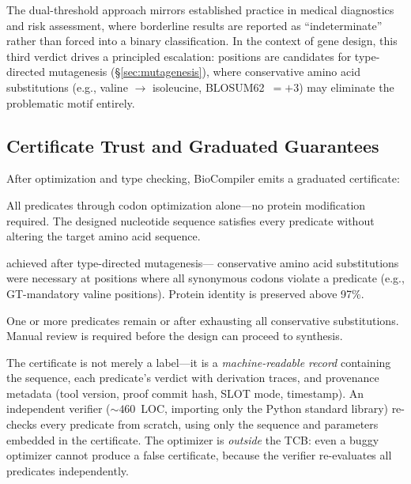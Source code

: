The dual-threshold approach mirrors established practice in medical
diagnostics and risk assessment, where borderline results are reported
as ``indeterminate'' rather than forced into a binary classification.
In the context of gene design, this third verdict drives a principled
escalation: \UNCERTAIN{} positions are candidates for type-directed
mutagenesis (\S\ref{sec:mutagenesis}), where conservative amino acid
substitutions (e.g., valine $\to$ isoleucine, BLOSUM62~$= +3$) may
eliminate the problematic motif entirely.

\subsection{Certificate Trust and Graduated Guarantees}

After optimization and type checking, BioCompiler emits a graduated
certificate:
\begin{description}[leftmargin=!,labelwidth=1.4cm,itemsep=1pt,
                     topsep=1pt]
\item[\GOLD] All predicates \PASS{} through codon optimization
      alone---no protein modification required.
      The designed nucleotide sequence satisfies every predicate
      without altering the target amino acid sequence.
\item[\SILVER] \PASS{} achieved after type-directed mutagenesis---
      conservative amino acid substitutions were necessary at positions
      where all synonymous codons violate a predicate (e.g.,
      GT-mandatory valine positions).
      Protein identity is preserved above 97\%.
\item[\BRONZE] One or more predicates remain \UNCERTAIN{} or \FAIL{}
      after exhausting all conservative substitutions.
      Manual review is required before the design can proceed to
      synthesis.
\end{description}

The certificate is not merely a label---it is a \emph{machine-readable
record} containing the sequence, each predicate's verdict with
derivation traces, and provenance metadata (tool version, proof commit
hash, SLOT mode, timestamp).
An independent verifier (${\sim}460$~LOC, importing only the Python
standard library) re-checks every predicate from scratch, using only
the sequence and parameters embedded in the certificate.
The optimizer is \emph{outside} the TCB: even a buggy optimizer
cannot produce a false \PASS{} certificate, because the verifier
re-evaluates all predicates independently.

